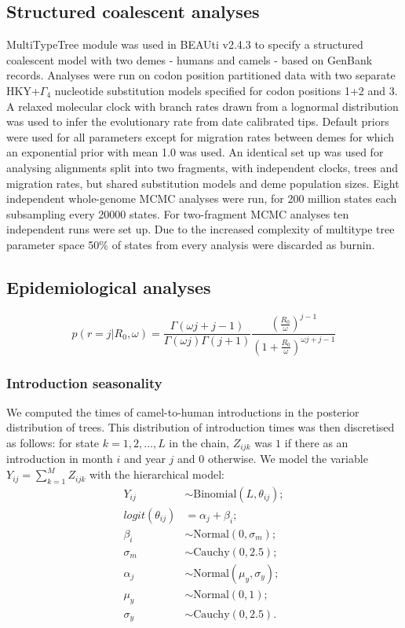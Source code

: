 \documentclass[11pt,oneside,letterpaper]{article}
\begin{document}
\subsection*{Structured coalescent analyses}
MultiTypeTree module \citep{vaughan_efficient_2014} was used in BEAUti v2.4.3 \citep{bouckaert_beast_2014} to specify a structured coalescent model with two demes - humans and camels - based on GenBank records.
Analyses were run on codon position partitioned data with two separate HKY+$\Gamma_{4}$ \citep{hky_1985,yang_1994} nucleotide substitution models specified for codon positions 1+2 and 3.
A relaxed molecular clock with branch rates drawn from a lognormal distribution \citep{drummond_2006} was used to infer the evolutionary rate from date calibrated tips.
Default priors were used for all parameters except for migration rates between demes for which an exponential prior with mean 1.0 was used.
An identical set up was used for analysing alignments split into two fragments, with independent clocks, trees and migration rates, but shared substitution models and deme population sizes.
Eight independent whole-genome MCMC analyses were run, for 200 million states each subsampling every 20000 states.
For two-fragment MCMC analyses ten independent runs were set up.
Due to the increased complexity of multitype tree parameter space 50\% of states from every analysis were discarded as burnin.

\subsection*{Epidemiological analyses}


\begin{equation}
p(r = j | R_{0}, \omega) = \frac{\Gamma(\omega j+j-1)}{\Gamma(\omega j)\Gamma(j+1)} \frac{(\frac{R_{0}}{\omega})^{j-1}}{(1+\frac{R_{0}}{\omega})^{\omega j+j-1}}
\end{equation}

\subsubsection*{Introduction seasonality}
We computed the times of camel-to-human introductions in the posterior distribution of trees.
This distribution of introduction times was then discretised as follows: for state  $k = 1, 2, \ldots, L$ in the chain,  $Z_{ijk}$ was $1$ if there as an introduction in month $i$ and year $j$ and $0$ otherwise.
We model the variable $Y_{ij} = \sum_{k = 1}^M Z_{ijk}$ with the hierarchical model:
\begin{align}
 Y_{ij} &\sim \text{Binomial}(L, \theta_{ij}); \\
 logit(\theta_{ij}) &= \alpha_j + \beta_i; \\
 \beta_i &\sim \text{Normal}(0, \sigma_{m}); \\ 
  \sigma_{m} &\sim \text{Cauchy}(0, 2.5); \\
 \alpha_j &\sim \text{Normal}(\mu_{y}, \sigma_{y});  \\
 \mu_{y}  &\sim  \text{Normal}(0, 1); \\
 \sigma_{y} &\sim \text{Cauchy}(0, 2.5).
\end{align}
\end{document}
